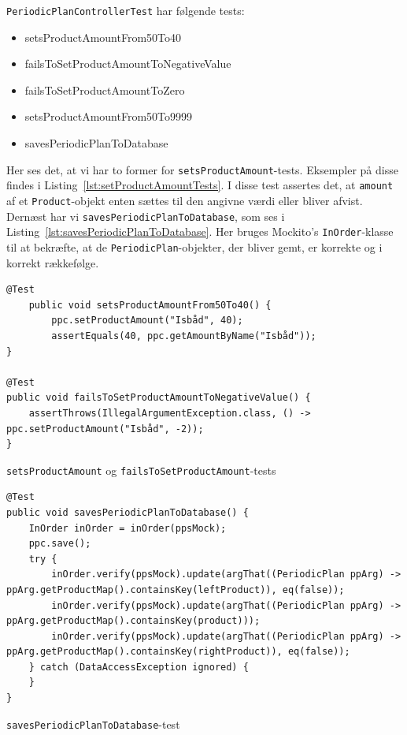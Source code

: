 \texttt{PeriodicPlanControllerTest} har følgende tests:
\begin{itemize}
    \item setsProductAmountFrom50To40
    \item failsToSetProductAmountToNegativeValue
    \item failsToSetProductAmountToZero
    \item setsProductAmountFrom50To9999
    \item savesPeriodicPlanToDatabase
\end{itemize}
Her ses det, at vi har to former for \texttt{setsProductAmount}-tests. Eksempler på disse findes i Listing~\ref{lst:setProductAmountTests}. I disse test assertes det, at \texttt{amount} af et \texttt{Product}-objekt enten sættes til den angivne værdi eller bliver afvist. Dernæst har vi \texttt{savesPeriodicPlanToDatabase}, som ses i Listing~\ref{lst:savesPeriodicPlanToDatabase}. Her bruges Mockito's \texttt{InOrder}-klasse til at bekræfte, at de \texttt{PeriodicPlan}-objekter, der bliver gemt, er korrekte og i korrekt rækkefølge.

\begin{listing}[h]
    \begin{verbatim}
@Test
    public void setsProductAmountFrom50To40() {
        ppc.setProductAmount("Isbåd", 40);
        assertEquals(40, ppc.getAmountByName("Isbåd"));
}
    
@Test
public void failsToSetProductAmountToNegativeValue() {
    assertThrows(IllegalArgumentException.class, () -> ppc.setProductAmount("Isbåd", -2));
}
    \end{verbatim}
    \caption{\texttt{setsProductAmount} og \texttt{failsToSetProductAmount}-tests \label{lst:setProductAmountTests}}
\end{listing}

\begin{listing}[h]
    \begin{verbatim}
@Test
public void savesPeriodicPlanToDatabase() {
    InOrder inOrder = inOrder(ppsMock);
    ppc.save();
    try {
        inOrder.verify(ppsMock).update(argThat((PeriodicPlan ppArg) -> ppArg.getProductMap().containsKey(leftProduct)), eq(false));
        inOrder.verify(ppsMock).update(argThat((PeriodicPlan ppArg) -> ppArg.getProductMap().containsKey(product)));
        inOrder.verify(ppsMock).update(argThat((PeriodicPlan ppArg) -> ppArg.getProductMap().containsKey(rightProduct)), eq(false));
    } catch (DataAccessException ignored) {
    }
}
    \end{verbatim}
    \caption{\texttt{savesPeriodicPlanToDatabase}-test \label{lst:savesPeriodicPlanToDatabase}}
\end{listing}

